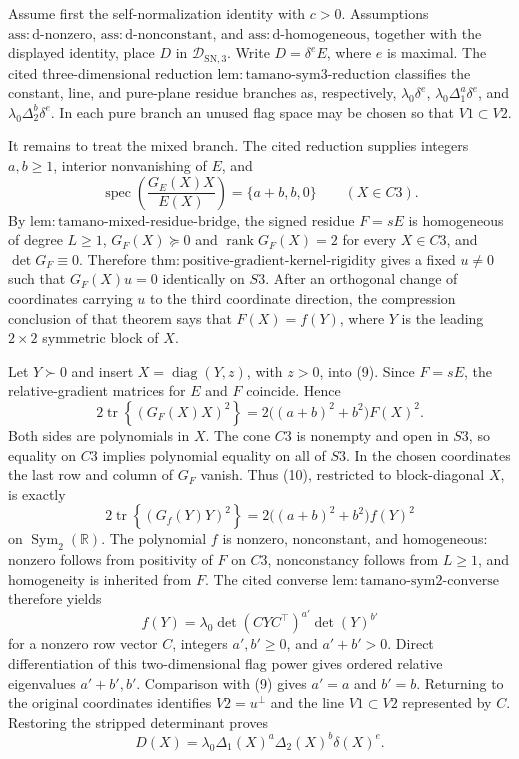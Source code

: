 Assume first the self-normalization identity with \(c>0\).  Assumptions
\(\mathrm{ass{:}d\text{-}nonzero}\), \(\mathrm{ass{:}d\text{-}nonconstant}\),
and \(\mathrm{ass{:}d\text{-}homogeneous}\), together with the displayed
identity, place \(D\) in \(\mathcal D_{\mathrm{SN},3}\).  Write
\(D=\delta^eE\), where \(e\) is maximal.  The cited three-dimensional
reduction \(\mathrm{lem{:}tamano\text{-}sym3\text{-}reduction}\) classifies
the constant, line, and pure-plane residue branches as, respectively,
\(\lambda_0\delta^e\), \(\lambda_0\Delta_1^a\delta^e\), and
\(\lambda_0\Delta_2^b\delta^e\).  In each pure branch an unused flag
space may be chosen so that \(V1\subset V2\).

It remains to treat the mixed branch.  The cited reduction supplies
integers \(a,b\geq1\), interior nonvanishing of \(E\), and
\[
 \operatorname{spec}\!\left(\frac{G_E(X)X}{E(X)}\right)
 =\{a+b,b,0\}
 \qquad (X\in C3).                                                    \tag{9}
\]
By \(\mathrm{lem{:}tamano\text{-}mixed\text{-}residue\text{-}bridge}\),
the signed residue \(F=sE\) is homogeneous of degree \(L\geq1\),
\(G_F(X)\succeq0\) and \(\operatorname{rank}G_F(X)=2\) for every
\(X\in C3\), and \(\det G_F\equiv0\).  Therefore
\(\mathrm{thm{:}positive\text{-}gradient\text{-}kernel\text{-}rigidity}\)
gives a fixed \(u\neq0\) such that \(G_F(X)u=0\) identically on \(S3\).
After an orthogonal change of coordinates carrying \(u\) to the third
coordinate direction, the compression conclusion of that theorem says
that \(F(X)=f(Y)\), where \(Y\) is the leading \(2\times2\) symmetric
block of \(X\).

Let \(Y\succ0\) and insert \(X=\operatorname{diag}(Y,z)\), with
\(z>0\), into (9).  Since \(F=sE\), the relative-gradient matrices for
\(E\) and \(F\) coincide.  Hence
\[
 2\operatorname{tr}\!\left\{(G_F(X)X)^2\right\}
 =2\bigl((a+b)^2+b^2\bigr)F(X)^2.                                   \tag{10}
\]
Both sides are polynomials in \(X\).  The cone \(C3\) is nonempty and
open in \(S3\), so equality on \(C3\) implies polynomial equality on
all of \(S3\).  In the chosen coordinates the last row and column of
\(G_F\) vanish.  Thus (10), restricted to block-diagonal \(X\), is
exactly
\[
 2\operatorname{tr}\!\left\{(G_f(Y)Y)^2\right\}
 =2\bigl((a+b)^2+b^2\bigr)f(Y)^2
\]
on \(\operatorname{Sym}_2(\mathbb R)\).  The polynomial \(f\) is
nonzero, nonconstant, and homogeneous: nonzero follows from positivity
of \(F\) on \(C3\), nonconstancy follows from \(L\geq1\), and
homogeneity is inherited from \(F\).  The cited converse
\(\mathrm{lem{:}tamano\text{-}sym2\text{-}converse}\) therefore yields
\[
 f(Y)=\lambda_0\det(CYC^{\top})^{a'}\det(Y)^{b'}
\]
for a nonzero row vector \(C\), integers \(a',b'\geq0\), and
\(a'+b'>0\).  Direct differentiation of this two-dimensional flag
power gives ordered relative eigenvalues \(a'+b',b'\).  Comparison with
(9) gives \(a'=a\) and \(b'=b\).  Returning to the original coordinates
identifies \(V2=u^{\perp}\) and the line \(V1\subset V2\) represented by
\(C\).  Restoring the stripped determinant proves
\[
 D(X)=\lambda_0\Delta_1(X)^a\Delta_2(X)^b\delta(X)^e.                \tag{11}
\]

